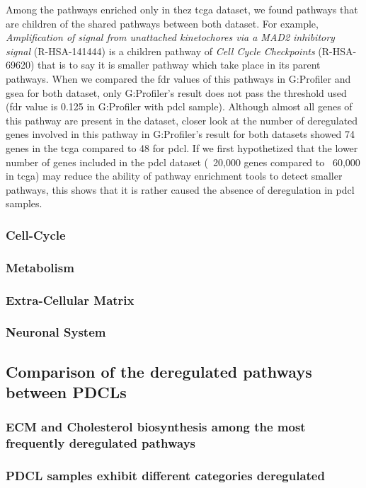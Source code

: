 Among the pathways enriched only in thez \acrshort{tcga} dataset, we found pathways that are children of the shared pathways between both dataset.
For example, \textit{Amplification of signal from unattached kinetochores via a MAD2 inhibitory signal} (R-HSA-141444) is a children pathway of \textit{Cell Cycle Checkpoints} (R-HSA-69620) that is to say it is smaller pathway which take place in its parent pathways.
When we compared the \acrshort{fdr} values of this pathways in G:Profiler and \acrshort{gsea} for both dataset, only G:Profiler's result does not pass the threshold used (\acrshort{fdr} value is 0.125 in G:Profiler with \acrshort{pdcl} sample).
Although almost all genes of this pathway are present in the dataset, closer look at the number of deregulated genes involved in this pathway in G:Profiler's result for both datasets showed 74 genes in the \acrshort{tcga} compared to 48 for \acrshort{pdcl}.
If we first hypothetized that the lower number of genes included in the \acrshort{pdcl} dataset (~20,000 genes compared to ~60,000 in \acrshort{tcga}) may reduce the ability of pathway enrichment tools to detect smaller pathways, this shows that it is rather caused the absence of deregulation in \acrshort{pdcl} samples.

\subsubsection{Cell-Cycle}

\subsubsection{Metabolism}

\subsubsection{Extra-Cellular Matrix}

\subsubsection{Neuronal System}

\subsection{Comparison of the deregulated pathways between PDCLs}

\subsubsection{ECM and Cholesterol biosynthesis among the most frequently deregulated pathways}

\subsubsection{PDCL samples exhibit different categories deregulated}

